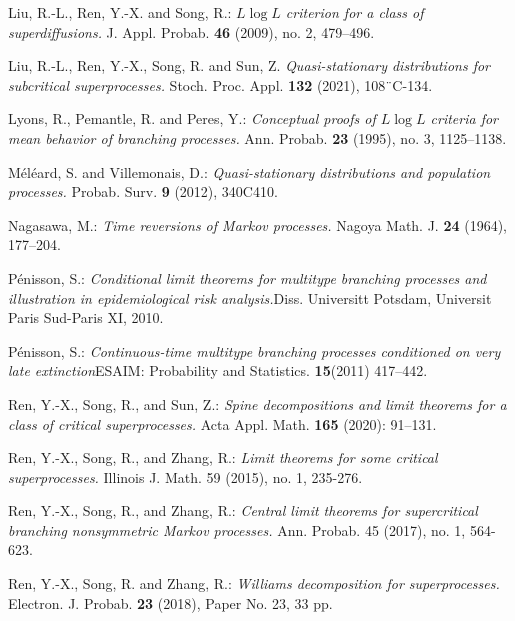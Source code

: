 \documentclass[12pt,a4paper]{amsart}
\numberwithin{equation}{section}
\theoremstyle{plain}
\theoremstyle{definition}
\theoremstyle{remark}
\begin{document}
\begin{thebibliography}{99}
Liu, R.-L., Ren, Y.-X. and Song, R.:
\emph{{$L \log L$} criterion for a class of superdiffusions.}
J. Appl. Probab. \textbf{46} (2009), no. 2, 479--496.

Liu, R.-L., Ren, Y.-X., Song, R. and Sun, Z.
\emph{Quasi-stationary distributions for subcritical superprocesses.}
Stoch. Proc. Appl. \textbf{132} (2021), 108¨C-134.



Lyons, R., Pemantle, R. and Peres, Y.:
\emph{Conceptual proofs of $L\log L$ criteria for mean behavior of branching processes.}
Ann. Probab. \textbf{23} (1995), no. 3, 1125--1138.

M\'el\'eard, S. and Villemonais, D.:
\emph{Quasi-stationary distributions and population processes.}
Probab. Surv. \textbf{9} (2012), 340C410.

Nagasawa, M.:
\emph{Time reversions of Markov processes.}
Nagoya Math. J. \textbf{24} (1964), 177--204.

P\'enisson, S.:
\emph{Conditional limit theorems for multitype branching processes and illustration in epidemiological risk analysis.}Diss. Universitt Potsdam, Universit Paris Sud-Paris XI, 2010.

P\'enisson, S.:
\emph{Continuous-time multitype branching processes conditioned on very late extinction}ESAIM: Probability and Statistics. \textbf{15}(2011) 417--442.

	Ren, Y.-X., Song, R., and Sun, Z.:
	\emph{Spine decompositions and limit theorems for a class of critical superprocesses.}
	Acta Appl. Math. \textbf{165} (2020): 91--131.

Ren, Y.-X., Song, R., and Zhang, R.:
\emph{Limit theorems for some critical superprocesses.}
Illinois J. Math. 59 (2015), no. 1, 235-276.

Ren, Y.-X., Song, R., and Zhang, R.:
\emph{Central limit theorems for supercritical branching nonsymmetric Markov processes.}
Ann. Probab. 45 (2017), no. 1, 564-623.

Ren, Y.-X., Song, R. and Zhang, R.:
\emph{Williams decomposition for superprocesses.}
Electron. J. Probab. \textbf{23} (2018), Paper No. 23, 33 pp.


\end{thebibliography}
\end{document}
